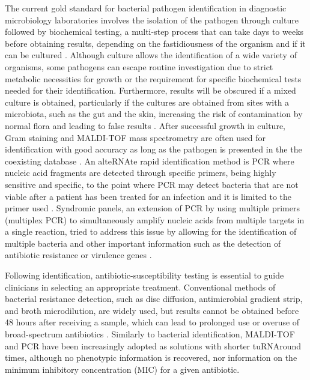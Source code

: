 The current gold standard for bacterial pathogen identification in diagnostic microbiology laboratories involves the isolation of the pathogen through culture followed by biochemical testing, a multi-step process that can take days to weeks before obtaining results, depending on the fastidiousness of the organism and if it can be cultured \citep{muhamad_rizal_advantages_2020, giuliano_guide_2019, muhamad_rizal_advantages_2020}. 
Although culture allows the identification of a wide variety of organisms, some pathogens can escape routine investigation due to strict metabolic necessities for growth or the requirement for specific biochemical tests needed for their identification. 
Furthermore, results will be obscured if a mixed culture is obtained, particularly if the cultures are obtained from sites with a microbiota, such as the gut and the skin, increasing the risk of contamination by normal flora and leading to false results \citep{giuliano_guide_2019}. 
After successful growth in culture, Gram staining and MALDI-TOF mass spectrometry are often used for identification with good accuracy as long as the pathogen is presented in the the coexisting database \citep{patel_maldi-tof_2015}. 
An alte\ac{RNA}te rapid identification method is \ac{PCR} where nucleic acid fragments are detected through specific primers, being highly sensitive and specific, to the point where \ac{PCR} may detect bacteria that are not viable after a patient has been treated for an infection and it is limited to the primer used \citep{scerbo_beyond_2016}. 
Syndromic panels, an extension of \ac{PCR} by using multiple primers (multiplex \ac{PCR}) to simultaneously amplify nucleic acids from multiple targets in a single reaction, tried to address this issue by allowing for the identification of multiple bacteria and other important information such as the detection of antibiotic resistance or virulence genes \citep{giuliano_guide_2019}.

Following identification, antibiotic-susceptibility testing is essential to guide clinicians in selecting an appropriate treatment. 
Conventional methods of bacterial resistance detection, such as disc diffusion, antimicrobial gradient strip, and broth microdilution, are widely used, but results cannot be obtained before 48 hours after receiving a sample, which can lead to prolonged use or overuse of broad-spectrum antibiotics \citep{benkova_antimicrobial_2020}. 
Similarly to bacterial identification, MALDI-TOF and \ac{PCR} have been increasingly adopted as solutions with shorter tu\ac{RNA}round times, although no phenotypic information is recovered, nor information on the minimum inhibitory concentration (MIC) for a given antibiotic.   

